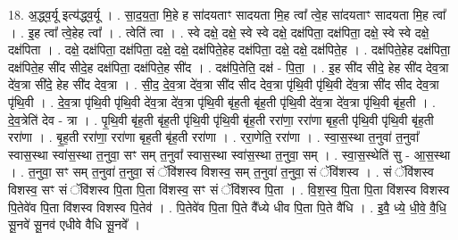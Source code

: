 \documentclass[17pt]{extarticle}
\begin{document}
18. अ॒द्ध्व॒र्यू इत्य॑द्ध्व॒र्यू । . सा॒द॒य॒ता॒ मि॒हे ह सा॑दयताꣳ सादयता मि॒ह त्वा᳚ त्वे॒ह सा॑दयताꣳ सादयता मि॒ह त्वा᳚ । . इ॒ह त्वा᳚ त्वे॒हेह त्वा᳚ । . त्वेति॑ त्वा । . स्वे दक्षे॒ दक्षे॒ स्वे स्वे दक्षे॒ दक्ष॑पिता॒ दक्ष॑पिता॒ दक्षे॒ स्वे स्वे दक्षे॒ दक्ष॑पिता । . दक्षे॒ दक्ष॑पिता॒ दक्ष॑पिता॒ दक्षे॒ दक्षे॒ दक्ष॑पिते॒हेह दक्ष॑पिता॒ दक्षे॒ दक्षे॒ दक्ष॑पिते॒ह । . दक्ष॑पिते॒हेह दक्ष॑पिता॒ दक्ष॑पिते॒ह सी॑द सीदे॒ह दक्ष॑पिता॒ दक्ष॑पिते॒ह सी॑द । . दक्ष॑पि॒तेति॒ दक्ष॑ - पि॒ता॒ । . इ॒ह सी॑द सीदे॒ हेह सी॑द देव॒त्रा दे॑व॒त्रा सी॑दे॒ हेह सी॑द देव॒त्रा । . सी॒द॒ दे॒व॒त्रा दे॑व॒त्रा सी॑द सीद देव॒त्रा पृ॑थि॒वी पृ॑थि॒वी दे॑व॒त्रा सी॑द सीद देव॒त्रा पृ॑थि॒वी । . दे॒व॒त्रा पृ॑थि॒वी पृ॑थि॒वी दे॑व॒त्रा दे॑व॒त्रा पृ॑थि॒वी बृ॑ह॒ती बृ॑ह॒ती पृ॑थि॒वी दे॑व॒त्रा दे॑व॒त्रा पृ॑थि॒वी बृ॑ह॒ती । . दे॒व॒त्रेति॑ देव - त्रा । . पृ॒थि॒वी बृ॑ह॒ती बृ॑ह॒ती पृ॑थि॒वी पृ॑थि॒वी बृ॑ह॒ती ररा॑णा॒ ररा॑णा बृह॒ती पृ॑थि॒वी पृ॑थि॒वी बृ॑ह॒ती ररा॑णा । . बृ॒ह॒ती ररा॑णा॒ ररा॑णा बृह॒ती बृ॑ह॒ती ररा॑णा । . ररा॒णेति॒ ररा॑णा । . स्वा॒स॒स्था त॒नुवा॑ त॒नुवा᳚ स्वास॒स्था स्वा॑स॒स्था त॒नुवा॒ सꣳ सम् त॒नुवा᳚ स्वास॒स्था स्वा॑स॒स्था त॒नुवा॒ सम् । . स्वा॒स॒स्थेति॑ सु - आ॒स॒स्था । . त॒नुवा॒ सꣳ सम् त॒नुवा॑ त॒नुवा॒ सं ॅवि॑शस्व विशस्व॒ सम् त॒नुवा॑ त॒नुवा॒ सं ॅवि॑शस्व । . सं ॅवि॑शस्व विशस्व॒ सꣳ सं ॅवि॑शस्व पि॒ता पि॒ता वि॑शस्व॒ सꣳ सं ॅवि॑शस्व पि॒ता । . वि॒श॒स्व॒ पि॒ता पि॒ता वि॑शस्व विशस्व पि॒तेवे॑व पि॒ता वि॑शस्व विशस्व पि॒तेव॑ । . पि॒तेवे॑व पि॒ता पि॒ते वै᳚ध्ये धीव पि॒ता पि॒ते वै॑धि । . इ॒वै॒ ध्ये॒ धी॒वे॒ वै॒धि॒ सू॒नवे॑ सू॒नव॑ एधीवे वैधि सू॒नवे᳚ । \newline
\end{document}
